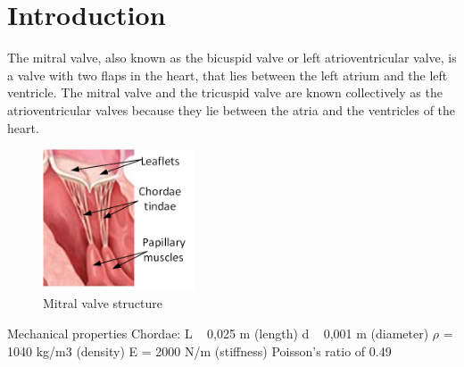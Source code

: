 \chapter*{Introduction}
The mitral valve, also known as the bicuspid valve or left atrioventricular
valve, is a valve with two flaps in the heart, that lies between the left atrium
and the left ventricle. The mitral valve and the tricuspid valve are known
collectively as the atrioventricular valves because they lie between the atria
and the ventricles of the heart.
\begin{figure}[H]
  \centering
  \includegraphics[width=0.4\textwidth]{./fig/mt.png}
    \caption{Mitral valve structure}
    \label{fig:normalMT}
\end{figure}
Mechanical properties
Chordae:
L ~ 0,025 m (length)
d ~ 0,001 m (diameter)
$\rho$ = 1040 kg/m3 (density)
E = 2000 N/m (stiffness)
Poisson's ratio of 0.49

